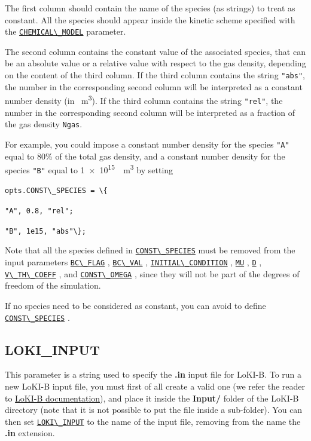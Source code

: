 \documentclass[12pt,a4paper]{article}
\newcommand{\matlabs}[1]{{\lstinline[style=MatlabStyle]!#1!}}
\newcommand{\seclink}[2]{%
	\begingroup
	\hypersetup{linkcolor=orange}%
	\hyperref[sec:#1]{\matlabs{#2}}%
	\endgroup
}
\begin{document}
	The first column should contain the name of the species (as strings) to treat as constant. All the species should appear inside the kinetic scheme specified with the \seclink{chemicalmodel}{CHEMICAL\_MODEL} parameter.
	
	The second column contains the constant value of the associated species, that can be an absolute value or a relative value with respect to the gas density, depending on the content of the third column.
	If the third column contains the string \matlabs{"abs"}, the number in the corresponding second column will be interpreted as a constant number density (in \unit{\per\cubic\meter}). If the third column contains the string \matlabs{"rel"}, the number in the corresponding second column will be interpreted as a fraction of the gas density \matlabs{Ngas}.
	
	For example, you could impose a constant number density for the species \matlabs{"A"} equal to 80\% of the total gas density, and a constant number density for the species \matlabs{"B"} equal to \SI{1e15}{\per\cubic\meter} by setting 
	
	\matlabs{opts.CONST\_SPECIES = \{}
			
	\hspace{40pt} \matlabs{"A", 0.8, "rel";}
		
	\hspace{40pt} \matlabs{"B", 1e15, "abs"\};}
	
	\noindent Note that all the species defined in \seclink{constspecies}{CONST\_SPECIES} must be removed from the input parameters \seclink{bcflag}{BC\_FLAG}, \seclink{bcval}{BC\_VAL}, \seclink{initial}{INITIAL\_CONDITION}, \seclink{mu}{MU}, \seclink{d}{D}, \seclink{vthcoeff}{V\_TH\_COEFF}, and \seclink{constomega}{CONST\_OMEGA}, since they will not be part of the degrees of freedom of the simulation.
	
	\vspace{10pt}
	
	\noindent If no species need to be considered as constant, you can avoid to define \seclink{constspecies}{CONST\_SPECIES}.
	
	
	\subsection{LOKI\_INPUT}
	\label{sec:lokiinput}
	This parameter is a string used to specify the \textbf{.in} input file for LoKI-B.
	To run a new LoKI-B input file, you must first of all create a valid one (we refer the reader to \href{https://github.com/LoKI-Suite/LoKI-B/tree/master/Documentation}{LoKI-B documentation}), and place it inside the \textbf{Input/} folder of the LoKI-B directory (note that it is not possible to put the file inside a sub-folder). You can then set \seclink{lokiinput}{LOKI\_INPUT} to the name of the input file, removing from the name the \textbf{.in} extension. 
	
\end{document}
